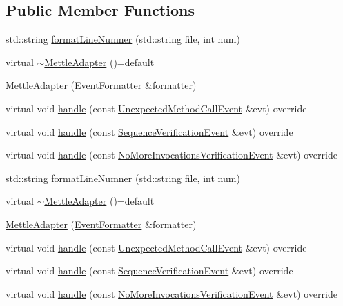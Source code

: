 \subsection*{Public Member Functions}
\begin{DoxyCompactItemize}
\item 
std\+::string \mbox{\hyperlink{structfakeit_1_1MettleAdapter_abd44747bce7bbc8aaa94fe8a742bf5c6}{format\+Line\+Numner}} (std\+::string file, int num)
\item 
virtual \mbox{\hyperlink{structfakeit_1_1MettleAdapter_a053c1ed07c06f9bafa9445aefec78348}{$\sim$\+Mettle\+Adapter}} ()=default
\item 
\mbox{\hyperlink{structfakeit_1_1MettleAdapter_a0d89a32cd8b88da3f8abacc54c0414a2}{Mettle\+Adapter}} (\mbox{\hyperlink{structfakeit_1_1EventFormatter}{Event\+Formatter}} \&formatter)
\item 
virtual void \mbox{\hyperlink{structfakeit_1_1MettleAdapter_a4abbacb12107084c5382975044282afe}{handle}} (const \mbox{\hyperlink{structfakeit_1_1UnexpectedMethodCallEvent}{Unexpected\+Method\+Call\+Event}} \&evt) override
\item 
virtual void \mbox{\hyperlink{structfakeit_1_1MettleAdapter_a99ed1d275645c78140a55f0a7110b281}{handle}} (const \mbox{\hyperlink{structfakeit_1_1SequenceVerificationEvent}{Sequence\+Verification\+Event}} \&evt) override
\item 
virtual void \mbox{\hyperlink{structfakeit_1_1MettleAdapter_a1256c2d0349a01abb4f0e348c90fc59b}{handle}} (const \mbox{\hyperlink{structfakeit_1_1NoMoreInvocationsVerificationEvent}{No\+More\+Invocations\+Verification\+Event}} \&evt) override
\item 
std\+::string \mbox{\hyperlink{structfakeit_1_1MettleAdapter_abd44747bce7bbc8aaa94fe8a742bf5c6}{format\+Line\+Numner}} (std\+::string file, int num)
\item 
virtual \mbox{\hyperlink{structfakeit_1_1MettleAdapter_a053c1ed07c06f9bafa9445aefec78348}{$\sim$\+Mettle\+Adapter}} ()=default
\item 
\mbox{\hyperlink{structfakeit_1_1MettleAdapter_a0d89a32cd8b88da3f8abacc54c0414a2}{Mettle\+Adapter}} (\mbox{\hyperlink{structfakeit_1_1EventFormatter}{Event\+Formatter}} \&formatter)
\item 
virtual void \mbox{\hyperlink{structfakeit_1_1MettleAdapter_a4abbacb12107084c5382975044282afe}{handle}} (const \mbox{\hyperlink{structfakeit_1_1UnexpectedMethodCallEvent}{Unexpected\+Method\+Call\+Event}} \&evt) override
\item 
virtual void \mbox{\hyperlink{structfakeit_1_1MettleAdapter_a99ed1d275645c78140a55f0a7110b281}{handle}} (const \mbox{\hyperlink{structfakeit_1_1SequenceVerificationEvent}{Sequence\+Verification\+Event}} \&evt) override
\item 
virtual void \mbox{\hyperlink{structfakeit_1_1MettleAdapter_a1256c2d0349a01abb4f0e348c90fc59b}{handle}} (const \mbox{\hyperlink{structfakeit_1_1NoMoreInvocationsVerificationEvent}{No\+More\+Invocations\+Verification\+Event}} \&evt) override
\end{DoxyCompactItemize}


